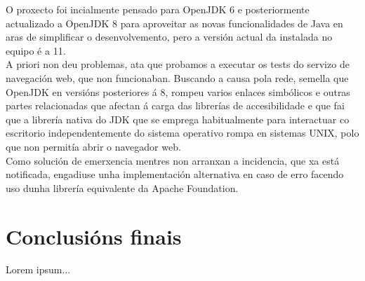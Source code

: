   O proxecto foi incialmente pensado para OpenJDK 6 e posteriormente actualizado
  a OpenJDK 8 para aproveitar as novas funcionalidades de Java en aras de
  simplificar o desenvolvemento, pero a versión actual da instalada no equipo é
  a 11. \\
  
  A priori non deu problemas, ata que probamos a executar os tests do servizo de
  navegación web, que non funcionaban. Buscando a causa pola rede, semella que
  OpenJDK en versións posteriores á 8, rompeu varios enlaces simbólicos e outras
  partes relacionadas que afectan á carga das librerías de accesibilidade e que
  fai que a librería nativa do JDK que se emprega habitualmente para interactuar
  co escritorio independentemente do sistema operativo rompa en sistemas UNIX,
  polo que non permitía abrir o navegador web. \\
  
  Como solución de emerxencia mentres non arranxan a incidencia, que xa está
  notificada, engadiuse unha implementación alternativa en caso de erro facendo
  uso dunha librería equivalente da Apache Foundation.

\section{Conclusións finais}

 Lorem ipsum...
